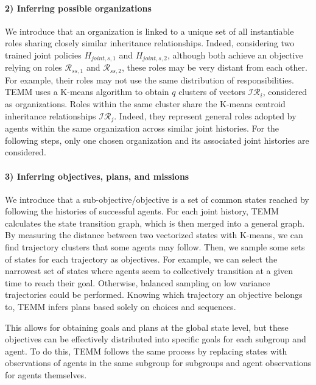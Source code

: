 \documentclass[sigconf,anonymous]{aamas}
\begin{document}
\paragraph{\textbf{2) Inferring possible organizations}}

We introduce that an organization is linked to a unique set of all instantiable roles sharing closely similar inheritance relationships. Indeed, considering two trained joint policies $H_{joint,s,1}$ and $H_{joint,s,2}$, although both achieve an objective relying on roles $\mathcal{R}_{ss,1}$ and $\mathcal{R}_{ss,2}$, these roles may be very distant from each other. For example, their roles may not use the same distribution of responsibilities.
TEMM uses a K-means algorithm to obtain $q$ clusters of vectors $\mathcal{IR}_{i}$, considered as organizations. Roles within the same cluster share the K-means centroid inheritance relationships $\mathcal{IR}_j$. Indeed, they represent general roles adopted by agents within the same organization across similar joint histories.
For the following steps, only one chosen organization and its associated joint histories are considered.

\paragraph{\textbf{3) Inferring objectives, plans, and missions}}

We introduce that a sub-objective/objective is a set of common states reached by following the histories of successful agents.
For each joint history, TEMM calculates the state transition graph, which is then merged into a general graph. By measuring the distance between two vectorized states with K-means, we can find trajectory clusters that some agents may follow. Then, we sample some sets of states for each trajectory as objectives. For example, we can select the narrowest set of states where agents seem to collectively transition at a given time to reach their goal. Otherwise, balanced sampling on low variance trajectories could be performed. Knowing which trajectory an objective belongs to, TEMM infers plans based solely on choices and sequences.

This allows for obtaining goals and plans at the global state level, but these objectives can be effectively distributed into specific goals for each subgroup and agent. To do this, TEMM follows the same process by replacing states with observations of agents in the same subgroup for subgroups and agent observations for agents themselves.
\end{document}
